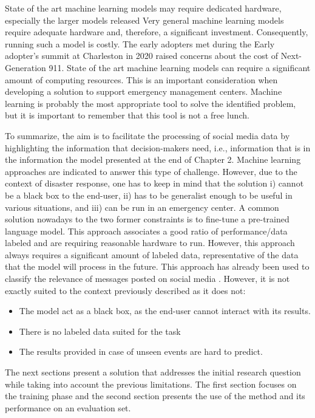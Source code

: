 State of the art machine learning models may require dedicated hardware, especially the
larger models released
Very general machine learning models require adequate hardware and, therefore, a significant investment.
Consequently, running such a model is costly.
The early adopters met during the Early adopter's summit at Charleston in 2020 raised concerns
about the cost of Next-Generation 911.
State of the art machine learning models can require a significant amount of computing
resources.
This is an important consideration when developing a solution to support emergency management centers.
Machine learning is probably the most appropriate tool to solve the identified problem,
but it is important to remember that this tool is not a free lunch.

To summarize, the aim is to facilitate the processing of social media data by highlighting
the information that decision-makers need, i.e., information that is in the information
the model presented at the end of Chapter 2.
Machine learning approaches are indicated to answer this type of challenge.
However, due to the context of disaster response, one has to keep in mind that the solution
i) cannot be a black box to the end-user, ii) has to be generalist enough to be useful in
various situations, and iii) can be run in an emergency center.
A common solution nowadays to the two former constraints is to fine-tune a pre-trained
language model.
This approach associates a good ratio of performance/data labeled and are requiring reasonable
hardware to run.
However, this approach always requires a significant amount of labeled data, representative
of the data that the model will process in the future.
This approach has already been used to classify the relevance of messages posted on social media \parencite{kozlowskiThreelevelClassificationFrench2020}.
However, it is not exactly suited to the context previously described as it does not:

\begin{itemize}
    \item The model act as a black box, as the end-user cannot interact with its results.
    \item There is no labeled data suited for the task
    \item The results provided in case of unseen events are hard to predict.
\end{itemize}

The next sections present a solution that addresses the initial research question while taking
into account the previous limitations.
The first section focuses on the training phase and the second section presents the use
of the method and its performance on an evaluation set.

